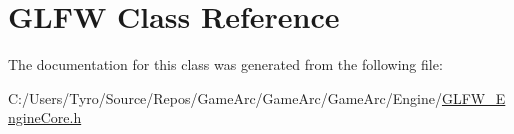 \hypertarget{class_g_l_f_w}{}\section{G\+L\+FW Class Reference}
\label{class_g_l_f_w}


The documentation for this class was generated from the following file\+:\begin{DoxyCompactItemize}
\item 
C\+:/\+Users/\+Tyro/\+Source/\+Repos/\+Game\+Arc/\+Game\+Arc/\+Game\+Arc/\+Engine/\mbox{\hyperlink{_g_l_f_w___engine_core_8h}{G\+L\+F\+W\+\_\+\+Engine\+Core.\+h}}\end{DoxyCompactItemize}
